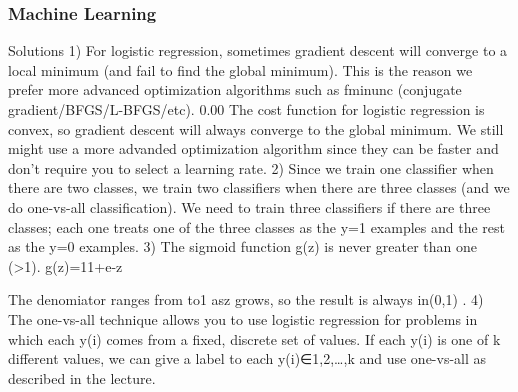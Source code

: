 \begin{frame}
	\frametitle{Machine Learning} 
	\large 

Solutions
1)
For logistic regression, sometimes gradient descent will converge to a local minimum (and fail to find the global minimum). This is the reason we prefer more advanced optimization algorithms such as fminunc (conjugate gradient/BFGS/L-BFGS/etc).  0.00
The cost function for logistic regression is convex, so gradient descent will always converge to the global minimum. We still might use a more advanded optimization algorithm since they can be faster and don't require you to select a learning rate. 
2)
Since we train one classifier when there are two classes, we train two classifiers when there are three classes (and we do one-vs-all classification).  
We need to train three classifiers if there are three classes; each one treats one of the three classes as the y=1 examples and the rest as the y=0 examples. 
3)
The sigmoid function g(z) is never greater than one (>1). g(z)=11+e-z  
 
The denomiator ranges from  to1 asz grows, so the result is always in(0,1) . 
4)
The one-vs-all technique allows you to use logistic regression for problems in which each y(i) comes from a fixed, discrete set of values. 
If each y(i) is one of k different values, we can give a label to each y(i)∈{1,2,…,k} and use one-vs-all as described in the lecture. 
\end{frame}

